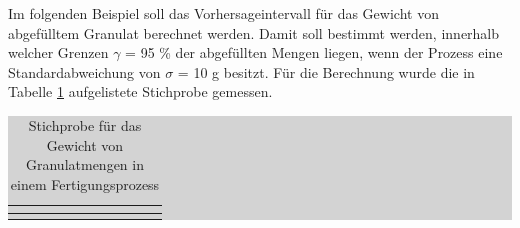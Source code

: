 \noindent Im folgenden Beispiel soll das Vorhersageintervall f\"{u}r das Gewicht von abgef\"{u}lltem Granulat berechnet werden. Damit soll bestimmt werden, innerhalb welcher Grenzen $\gamma$ = 95 \% der abgef\"{u}llten Mengen liegen, wenn der Prozess eine Standardabweichung von $\sigma$ = 10 g besitzt. F\"{u}r die Berechnung wurde die in Tabelle \ref{tab:fivefifteen} aufgelistete Stichprobe gemessen.

\begin{table}[H]
\caption{Stichprobe f\"{u}r das Gewicht von Granulatmengen in einem Fertigungsprozess}
\setlength{\fboxsep}{0pt}%
\colorbox{lightgray}{%
%
\begin{tabular}{| c | c | c | c | c | c | c | c | c | c | c |}
\hline

\parbox[c][0.3in][c]{1.05in}{\smallskip\centering\textbf{\selectfont{Stichprobe}}} &
\parbox[c][0.3in][c]{0.4in}{\centering{}\selectfont{1}} &
\parbox[c][0.3in][c]{0.4in}{\centering{}\selectfont{2}} &
\parbox[c][0.3in][c]{0.4in}{\centering{}\selectfont{3}} &
\parbox[c][0.3in][c]{0.4in}{\centering{}\selectfont{4}} &
\parbox[c][0.3in][c]{0.4in}{} &
\parbox[c][0.3in][c]{0.4in}{\centering{}\selectfont{6}} &
\parbox[c][0.3in][c]{0.4in}{\centering{}\selectfont{7}} &
\parbox[c][0.3in][c]{0.4in}{\centering{}\selectfont{8}} &
\parbox[c][0.3in][c]{0.4in}{\centering{}\selectfont{9}} &
\parbox[c][0.3in][c]{0.4in}{\centering{}\selectfont{10}} \\ \hline

\parbox[c][0.3in][c]{1.05in}{\smallskip\centering\textbf{\selectfont{Gewicht x / kg}}} &
\parbox[c][0.3in][c]{0.4in}{\selectfont{1.0729}} &
\parbox[c][0.3in][c]{0.4in}{\selectfont{1.0541}} &
\parbox[c][0.3in][c]{0.4in}{\selectfont{1.0566}} &
\parbox[c][0.3in][c]{0.4in}{\selectfont{1.0771}} &
\parbox[c][0.3in][c]{0.4in}{\selectfont{1.0556}}&
\parbox[c][0.3in][c]{0.4in}{\selectfont{1.0757}} &
\parbox[c][0.3in][c]{0.4in}{\selectfont{1.0862}} &
\parbox[c][0.3in][c]{0.4in}{\selectfont{1.0631}} &
\parbox[c][0.3in][c]{0.4in}{\selectfont{1.0786}} &
\parbox[c][0.3in][c]{0.4in}{\selectfont{1.0825}} \\ \hline

\end{tabular}%
}\bigskip
\label{tab:fivefifteen}
\end{table}

